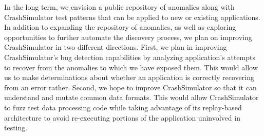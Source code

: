 In the long term, we
envision a public repository of anomalies along with CrashSimulator test
patterns that can be applied to new or existing applications.
In addition to expanding the repository of anomalies, as well as exploring
opportunities to further automate the discovery process, we plan on improving
CrashSimulator in two different directions.  First, we plan in improving
CrashSimulator's bug detection capabilities by analyzing application's attempts
to recover from the anomalies to which we have exposed them.  This would allow
us to make determinations about whether an application is correctly recovering
from an error rather.  Second, we hope to improve CrashSimulator so that it can
understand and mutate common data formats.  This would allow CrashSimulator
to fuzz test data processing code while taking advantage of its
replay-based architecture to avoid re-executing portions of the application
uninvolved in testing.
